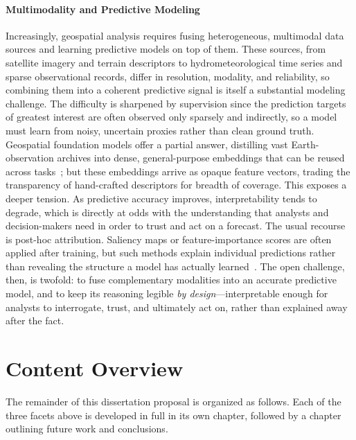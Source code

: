 \paragraph{Multimodality and Predictive Modeling}
%
Increasingly, geospatial analysis requires fusing heterogeneous, multimodal data sources and learning predictive models on top of them.
%
These sources, from satellite imagery and terrain descriptors to hydrometeorological time series and sparse observational records, differ in resolution, modality, and reliability, so combining them into a coherent predictive signal is itself a substantial modeling challenge.
%
The difficulty is sharpened by supervision since the prediction targets of greatest interest are often observed only sparsely and indirectly, so a model must learn from noisy, uncertain proxies rather than clean ground truth.
%
Geospatial foundation models offer a partial answer, distilling vast Earth-observation archives into dense, general-purpose embeddings that can be reused across tasks~\cite{brown_alphaearth_2025}; but these embeddings arrive as opaque feature vectors, trading the transparency of hand-crafted descriptors for breadth of coverage.
%
This exposes a deeper tension. 
%
As predictive accuracy improves, interpretability tends to degrade, which is directly at odds with the understanding that analysts and decision-makers need in order to trust and act on a forecast.
%
The usual recourse is post-hoc attribution.
%
Saliency maps or feature-importance scores are often applied after training, but such methods explain individual predictions rather than revealing the structure a model has actually learned~\cite{rudin_stop_2019}.
%
The open challenge, then, is twofold: to fuse complementary modalities into an accurate predictive model, and to keep its reasoning legible \emph{by design}---interpretable enough for analysts to interrogate, trust, and ultimately act on, rather than explained away after the fact.


\section{Content Overview}
%
The remainder of this dissertation proposal is organized as follows. Each of the three facets above is developed in full in its own chapter, followed by a chapter outlining future work and conclusions.

